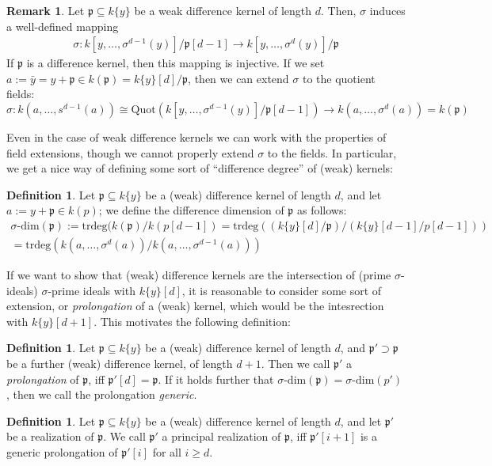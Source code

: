 \documentclass{article}
\def\p{\mathfrak{p}}
\def\s{\sigma}
\def\sdim{\sigma\text{-dim}}
\theoremstyle{definition}
\newtheorem{rem}[Satz]{Remark}
\newtheorem{defn}[Satz]{Definition}
\begin{document}
\begin{rem}\label{sigmawelldeffker}
Let $\p \subseteq k\{y\}$ be a weak difference kernel of length $d$. Then, $\s$ induces a well-defined mapping 
\begin{align*}
\s: k[y,\ldots,\s^{d-1}(y)]/\p[d-1] \rightarrow k[y,\ldots,\s^{d}(y)]/\p
\end{align*}
If $\p$ is a difference kernel, then this mapping is injective. 
If we set $a := \bar y = y + \p \in k(\p) = k\{y\}[d]/\p$, then we can extend $\s$ to the quotient fields:
\[ \s: k(a,\ldots,s^{d-1}(a)) \cong \text{Quot}(k[y,\ldots,\s^{d-1}(y)]/\p[d-1]) \rightarrow k(a,\ldots,\s^d(a)) = k(\p) \]
\end{rem}

Even in the case of weak difference kernels we can work with the properties of field extensions, though we cannot properly extend $\s$ to the fields.
 In particular, we get a nice way of defining some sort of ``difference degree'' of (weak) kernels:
\begin{defn}
Let $\p \subseteq k\{y\}$ be a (weak) difference kernel of length $d$, and let $a:= y + \p \in k(p)$; we define the difference dimension of $\p$ as follows:
\begin{align*} \sdim(\p) := \text{trdeg}(k(\p)/k(p[d-1]) = \text{trdeg}((k\{y\}[d]/\p)/(k\{y\}[d-1]/p[d-1])) \\  = \text{trdeg}(k(a,\ldots,\s^{d}(a))/k(a,\ldots,\s^{d-1}(a))) \end{align*}
\end{defn}\index{$\s$-dimension of a $\s$-kernel}

If we want to show that (weak) difference kernels are the intersection of (prime $\s$-ideals) $\s$-prime ideals with $k\{y\}[d]$,
it is reasonable to consider some sort of extension, or \emph{prolongation} of a (weak) kernel, which would be the intesrection with $k\{y\}[d+1]$. 
This motivates the following definition:

\begin{defn}
Let $\p \subseteq k\{y\}$ be a (weak) difference kernel of length $d$, and $\p' \supset \p$ be a further (weak) difference kernel, of length $d+1$.
Then we call $\p'$ a \emph{prolongation} of $\p$, iff $\p'[d] = \p$. If it holds further that $\sdim(\p) = \sdim(p')$, then we call the prolongation \emph{generic}.
\end{defn}


\begin{defn}
Let $\p \subseteq k\{y\}$ be a (weak) difference kernel of length $d$, and let $\p'$ be a realization of $\p$. We call $\p'$ a principal realization of $\p$, iff $\p'[i+1]$ is a generic prolongation of $\p'[i]$ for all $i \geq d$.
\end{defn}
\end{document}
